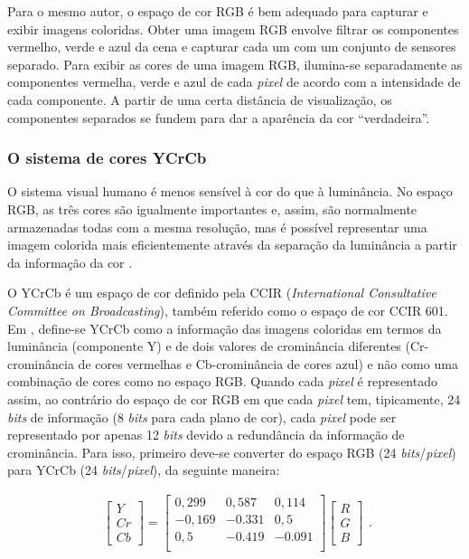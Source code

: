 Para o mesmo autor, o espaço de cor RGB é bem adequado para capturar e exibir imagens coloridas. Obter uma imagem RGB envolve filtrar os componentes vermelho, verde e azul da cena e capturar cada um com um conjunto de sensores separado. Para exibir as cores de uma imagem RGB, ilumina-se separadamente as componentes vermelha, verde e azul de cada \textit{pixel} de acordo com a intensidade de cada componente. A partir de uma certa distância de visualização, os componentes separados se fundem para dar a aparência da cor \enquote{verdadeira}. 

\subsubsection{O sistema de cores YCrCb}
O sistema visual humano é menos sensível à cor do que à luminância. No espaço RGB, as três cores são igualmente importantes e, assim, são normalmente armazenadas todas com a mesma resolução, mas é possível representar uma imagem colorida mais eficientemente através da separação da luminância a partir da informação da cor \cite{richardson2011h}.

O YCrCb é um espaço de cor definido pela CCIR (\textit{International Consultative Committee on Broadcasting}), também referido como o espaço de cor CCIR 601. Em \cite{acharya2002integrated}, define-se YCrCb como a informação  das imagens coloridas em termos da luminância (componente Y) e de dois valores de crominância diferentes (Cr-crominância de cores vermelhas e Cb-crominância de cores azul) e não como uma combinação de cores como no espaço RGB. Quando cada \textit{pixel} é representado assim, ao contrário do espaço de cor RGB em que cada \textit{pixel} tem, tipicamente, 24 \textit{bits} de informação (8 \textit{bits} para cada plano de cor), cada \textit{pixel} pode ser representado por apenas 12 \textit{bits} devido a redundância da informação de crominância. Para isso, primeiro deve-se converter do espaço RGB (24 \textit{bits}/\textit{pixel}) para YCrCb (24 \textit{bits}/\textit{pixel}), da seguinte maneira:

\begin{center}
	\begin{equation}
	\begin{split}
	\begin{bmatrix}		
	Y\\ Cr \\ Cb
	\end{bmatrix}
	 = 
	\begin{bmatrix}
  		0,299 & 0,587 &  0,114 \\
  		-0,169 &-0.331 & 0,5 \\
  		0,5  & -0.419  & -0.091\\
	\end{bmatrix}
	\begin{bmatrix}
	R\\ G \\ B
	\end{bmatrix}
	\label{rgb2yuv} 
	\end{split}.
	\end{equation}

\end{center}

